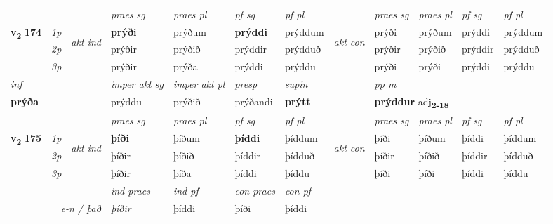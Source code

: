 \begin{longtable}[l]{X>{\footnotesize\itshape}llXXXXlXXXX}
 & &   & \textit{praes sg}  & \textit{praes pl}    & \textit{ pf sg} & \textit{pf pl} & & \textit{praes sg}  & \textit{praes pl}    & \textit{pf sg} & \textit{pf pl }  \\ \cmidrule{4-7} \cmidrule{9-12}
 \multirow{2}{*}{{{\textbf{v{\textsubscript{2}}} \Large{\textbf{174}}}}}  & 1p & \multirow{3}{*}{\begin{turn}{90}\textit{akt ind}\end{turn}} & \textbf{prýði} & prýðum & \textbf{prýddi} & prýddum & \multirow{3}{*}{\begin{turn}{90}\textit{akt con}\end{turn}} &prýði & prýðum & prýddi & prýddum\\*
 & 2p &  &  prýðir  & prýðið & prýddir & prýdduð & & prýðir & prýðið & prýddir & prýdduð \\*
 & 3p &  & prýðir & prýða & prýddi & prýddu & & prýði & prýði& prýddi & prýddu \\*
\cmidrule{4-7} \cmidrule{9-12}

   {\textit{inf}} & &  & \textit{imper akt sg} & \textit{imper akt pl}   & \textit{presp} & \textit{supin}  && \textit{pp m} \\*
  {\textbf{prýða}} & && prýddu  & prýðið   & prýðandi &  \textbf{prýtt}  && \multicolumn{2}{l}{\textbf{prýddur} adj\textbf{\textsubscript{2-18}}} \\*

\midrule

 & &   & \textit{praes sg}  & \textit{praes pl}    & \textit{ pf sg} & \textit{pf pl} & & \textit{praes sg}  & \textit{praes pl}    & \textit{pf sg} & \textit{pf pl }  \\ \cmidrule{4-7} \cmidrule{9-12}
 \multirow{2}{*}{{{\textbf{v{\textsubscript{2}}} \Large{\textbf{175}}}}}  & 1p & \multirow{3}{*}{\begin{turn}{90}\textit{akt ind}\end{turn}} & \textbf{þíði} & þíðum & \textbf{þíddi} & þíddum & \multirow{3}{*}{\begin{turn}{90}\textit{akt con}\end{turn}} &þíði & þíðum & þíddi & þíddum\\*
 & 2p &  &  þíðir  & þíðið & þíddir & þídduð & & þíðir & þíðið & þíddir & þídduð \\*
 & 3p &  & þíðir & þíða & þíddi & þíddu & & þíði & þíði& þíddi & þíddu \\*
\cmidrule{4-7} \cmidrule{9-12}

   && &  \textit{ind praes} & \textit{ind pf} & \textit{con praes} & \textit{con pf} \\*
\multicolumn{3}{r}{\textit{e-n / það}} & þíðir & þíddi & þíði & þíddi \\*


\end{longtable}
